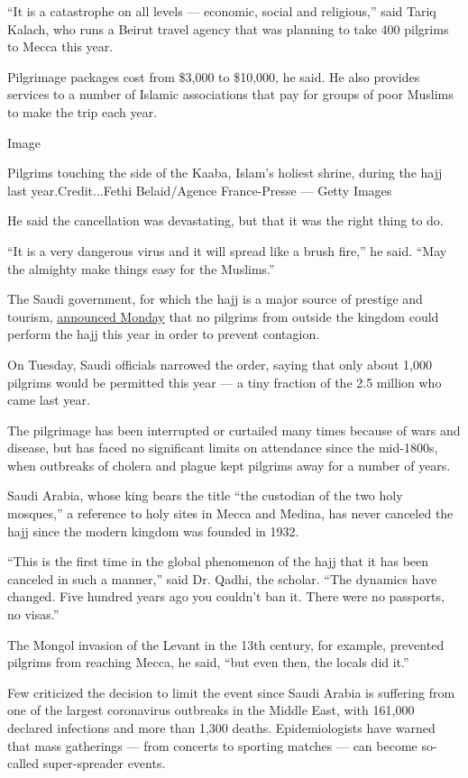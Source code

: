 ``It is a catastrophe on all levels --- economic, social and
religious,'' said Tariq Kalach, who runs a Beirut travel agency that was
planning to take 400 pilgrims to Mecca this year.

Pilgrimage packages cost from \$3,000 to \$10,000, he said. He also
provides services to a number of Islamic associations that pay for
groups of poor Muslims to make the trip each year.

Image

Pilgrims touching the side of the Kaaba, Islam's holiest shrine, during
the hajj last year.Credit...Fethi Belaid/Agence France-Presse --- Getty
Images

He said the cancellation was devastating, but that it was the right
thing to do.

``It is a very dangerous virus and it will spread like a brush fire,''
he said. ``May the almighty make things easy for the Muslims.''

The Saudi government, for which the hajj is a major source of prestige
and tourism,
\href{https://www.nytimes.com/2020/06/22/world/middleeast/saudi-arabia-hajj-mecca-pilgrims.html}{announced
Monday} that no pilgrims from outside the kingdom could perform the hajj
this year in order to prevent contagion.

On Tuesday, Saudi officials narrowed the order, saying that only about
1,000 pilgrims would be permitted this year --- a tiny fraction of the
2.5 million who came last year.

The pilgrimage has been interrupted or curtailed many times because of
wars and disease, but has faced no significant limits on attendance
since the mid-1800s, when outbreaks of cholera and plague kept pilgrims
away for a number of years.

Saudi Arabia, whose king bears the title ``the custodian of the two holy
mosques,'' a reference to holy sites in Mecca and Medina, has never
canceled the hajj since the modern kingdom was founded in 1932.

``This is the first time in the global phenomenon of the hajj that it
has been canceled in such a manner,'' said Dr. Qadhi, the scholar. ``The
dynamics have changed. Five hundred years ago you couldn't ban it. There
were no passports, no visas.''

The Mongol invasion of the Levant in the 13th century, for example,
prevented pilgrims from reaching Mecca, he said, ``but even then, the
locals did it.''

Few criticized the decision to limit the event since Saudi Arabia is
suffering from one of the largest coronavirus outbreaks in the Middle
East, with 161,000 declared infections and more than 1,300 deaths.
Epidemiologists have warned that mass gatherings --- from concerts to
sporting matches --- can become so-called super-spreader events.

